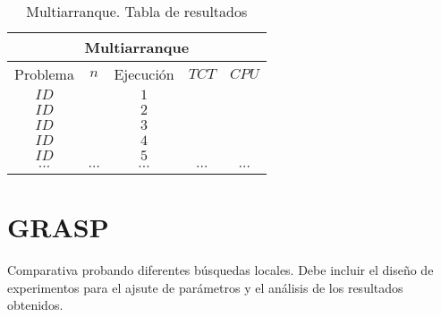    \begin{table}[h]
   {\small
   \begin{center}
   \begin{tabular}{ccccc}
      \multicolumn{5}{c}{Multiarranque} \\
      \hline
      Problema & $n$ &  Ejecuci\'on & $TCT$ & $CPU$ \\
      \hline
      $ID$   &     &     $1$      &       &       \\
      $ID$   &     &     $2$      &       &       \\
      $ID$   &     &     $3$      &       &       \\
      $ID$   &     &     $4$      &       &       \\
      $ID$   &     &     $5$      &       &       \\      
      $\cdots$ &$\cdots$ &$\cdots$ &$\cdots$ &$\cdots$ \\
      \hline
   \end{tabular}
   \end{center}
   }
   \caption{Multiarranque. Tabla de resultados}
   \end{table}


\section{GRASP}

Comparativa probando diferentes búsquedas locales.
Debe incluir el diseño de experimentos para el ajsute de parámetros y el análisis de los resultados obtenidos.


